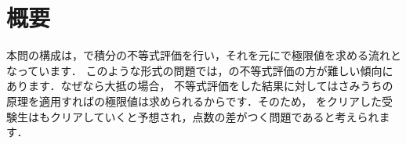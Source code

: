\documentclass[../../../doc/main]{subfiles}
\begin{document}
    \setcounter{chapter}{1}
    \setcounter{section}{0}
    \section{概要}\label{概要1}
        本問の構成は，\kakkoichi で積分の不等式評価を行い，それを元に\kakkoni で極限値を求める流れとなっています．
        このような形式の問題では，\kakkoichi の不等式評価の方が難しい傾向にあります．なぜなら大抵の場合，
        不等式評価をした結果に対してはさみうちの原理を適用すれば\kakkoni の極限値は求められるからです．そのため，\kakkoichi 
        をクリアした受験生は\kakkoni もクリアしていくと予想され，点数の差がつく問題であると考えられます．
\end{document}
